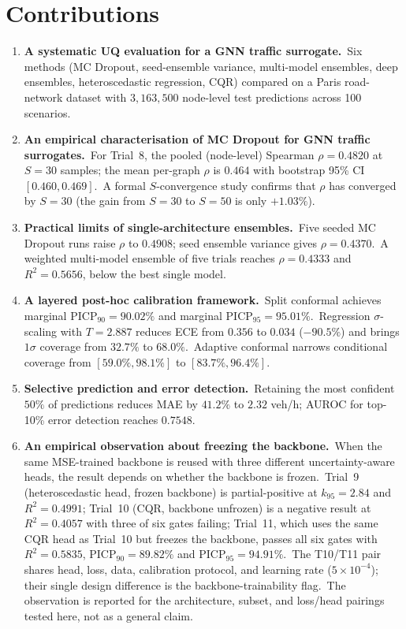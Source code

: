 \section{Contributions}\label{sec:contributions}

\begin{enumerate}
 \item \textbf{A systematic UQ evaluation for a GNN traffic surrogate.}\ Six methods (MC Dropout, seed-ensemble variance, multi-model ensembles, deep ensembles, heteroscedastic regression, CQR) compared on a Paris road-network dataset with $3{,}163{,}500$ node-level test predictions across 100 scenarios.

 \item \textbf{An empirical characterisation of MC Dropout for GNN traffic surrogates.}\ For Trial~8, the pooled (node-level) Spearman $\rho = 0.4820$ at $S = 30$ samples; the mean per-graph $\rho$ is $0.464$ with bootstrap 95\% CI $[0.460, 0.469]$.\ A formal $S$-convergence study confirms that $\rho$ has converged by $S = 30$ (the gain from $S = 30$ to $S = 50$ is only $+1.03\%$).

 \item \textbf{Practical limits of single-architecture ensembles.}\ Five seeded MC Dropout runs raise $\rho$ to $0.4908$; seed ensemble variance gives $\rho = 0.4370$.\ A weighted multi-model ensemble of five trials reaches $\rho = 0.4333$ and $R^2 = 0.5656$, below the best single model.

 \item \textbf{A layered post-hoc calibration framework.}\ Split conformal achieves marginal $\mathrm{PICP}_{90} = 90.02\%$ and marginal $\mathrm{PICP}_{95} = 95.01\%$.\ Regression $\sigma$-scaling with $T = 2.887$ reduces ECE from $0.356$ to $0.034$ ($-90.5\%$) and brings $1\sigma$ coverage from $32.7\%$ to $68.0\%$.\ Adaptive conformal narrows conditional coverage from $[59.0\%, 98.1\%]$ to $[83.7\%, 96.4\%]$.

 \item \textbf{Selective prediction and error detection.}\ Retaining the most confident $50\%$ of predictions reduces MAE by $41.2\%$ to $2.32$ veh/h; AUROC for top-10\% error detection reaches $0.7548$.

 \item \textbf{An empirical observation about freezing the backbone.}\ When the same MSE-trained backbone is reused with three different uncertainty-aware heads, the result depends on whether the backbone is frozen.\ Trial~9 (heteroscedastic head, frozen backbone) is partial-positive at $k_{95} = 2.84$ and $R^2 = 0.4991$; Trial~10 (CQR, backbone unfrozen) is a negative result at $R^2 = 0.4057$ with three of six gates failing; Trial~11, which uses the same CQR head as Trial~10 but freezes the backbone, passes all six gates with $R^2 = 0.5835$, $\mathrm{PICP}_{90} = 89.82\%$ and $\mathrm{PICP}_{95} = 94.91\%$.\ The T10/T11 pair shares head, loss, data, calibration protocol, and learning rate ($5\times10^{-4}$); their single design difference is the backbone-trainability flag.\ The observation is reported for the architecture, subset, and loss/head pairings tested here, not as a general claim.


\end{enumerate}
